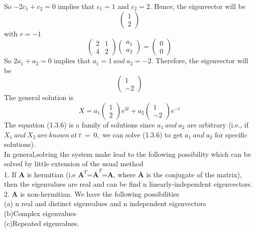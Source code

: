 \documentclass[a4paper,12pt]{report}
\numberwithin{equation}{section}
\begin{document}
So $ -2c_{1}+c_{2}=0 $ implies that $c_1 =1$ and $ c_{2}=2$. Hence, the eigenvector will be 
\begin{equation*}
\begin{pmatrix}
1 \\
2
\end{pmatrix}
\end{equation*}
with $r = -1$
\begin{equation*}
\left(\begin{matrix}
2 & 1\\
4 & 2
\end{matrix}\right) \begin{pmatrix}
a_{1} \\
a_{2}
\end{pmatrix}=\begin{pmatrix}
0 \\
0
\end{pmatrix} 
\end{equation*}
 So $ 2a_{1}+a_{2}=0 $ implies that $ a_{1}=1 \ and \ a_{2}=-2$. Therefore, the eigenvector will be 
 \begin{equation*}
 \begin{pmatrix}
 1 \\ 
 -2
 \end{pmatrix}
 \end{equation*}
 The general solution is
 \begin{equation}
 X = a_{1}\begin{pmatrix}
 1 \\
 2
 \end{pmatrix}e^{3t}+a_{2}\begin{pmatrix}
 1 \\
 -2
 \end{pmatrix}e^{-t}
 \end{equation}
 The equation (1.3.6) is a family of solutions since $a_{1} \ and \ a_{2}$ are arbitrary (i.e., if $X_{1} \ and \ X_{2} \ are \ known \ at \  t \ = \ 0, $ we can solve (1.3.6) to get $a_{1} \ and \ a_{2}$ for specific solutions).\\
In general,solving the system make lead to the following possibility which can be solved by little extension of the usual method \\
1. If \textbf{A} is hermitian (i.e $\textbf{A} ^{T}$=$\overline{\textbf{A}}^{T}$=$\textbf{A}$, where $\overline{\textbf{A}}$ is the conjugate of the matrix), then the eigenvalues are real and can be find n linearly-independent eigenvectors. \\
2. $\textbf{A}$ is non-hermitian. We  have the following possibilities \\
(a) n real and distinct eigenvalues and n independent eigenvectors \\
(b)Complex eigenvalues \\
(c)Repeated eigenvalues.
\end{document}
